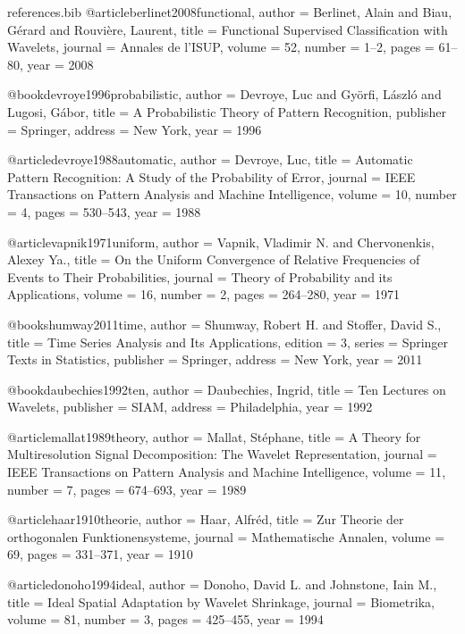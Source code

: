 \begin{filecontents*}[overwrite]{references.bib}
@article{berlinet2008functional,
  author  = {Berlinet, Alain and Biau, G{\'e}rard and Rouvi{\`e}re, Laurent},
  title   = {Functional Supervised Classification with Wavelets},
  journal = {Annales de l'ISUP},
  volume  = {52},
  number  = {1--2},
  pages   = {61--80},
  year    = {2008}
}

@book{devroye1996probabilistic,
  author    = {Devroye, Luc and Gy{\"o}rfi, L{\'a}szl{\'o} and Lugosi, G{\'a}bor},
  title     = {A Probabilistic Theory of Pattern Recognition},
  publisher = {Springer},
  address   = {New York},
  year      = {1996}
}

@article{devroye1988automatic,
  author  = {Devroye, Luc},
  title   = {Automatic Pattern Recognition: A Study of the Probability of Error},
  journal = {IEEE Transactions on Pattern Analysis and Machine Intelligence},
  volume  = {10},
  number  = {4},
  pages   = {530--543},
  year    = {1988}
}

@article{vapnik1971uniform,
  author  = {Vapnik, Vladimir N. and Chervonenkis, Alexey Ya.},
  title   = {On the Uniform Convergence of Relative Frequencies of Events to Their Probabilities},
  journal = {Theory of Probability and its Applications},
  volume  = {16},
  number  = {2},
  pages   = {264--280},
  year    = {1971}
}

@book{shumway2011time,
  author    = {Shumway, Robert H. and Stoffer, David S.},
  title     = {Time Series Analysis and Its Applications},
  edition   = {3},
  series    = {Springer Texts in Statistics},
  publisher = {Springer},
  address   = {New York},
  year      = {2011}
}

@book{daubechies1992ten,
  author    = {Daubechies, Ingrid},
  title     = {Ten Lectures on Wavelets},
  publisher = {SIAM},
  address   = {Philadelphia},
  year      = {1992}
}

@article{mallat1989theory,
  author  = {Mallat, St{\'e}phane},
  title   = {A Theory for Multiresolution Signal Decomposition: The Wavelet Representation},
  journal = {IEEE Transactions on Pattern Analysis and Machine Intelligence},
  volume  = {11},
  number  = {7},
  pages   = {674--693},
  year    = {1989}
}

@article{haar1910theorie,
  author  = {Haar, Alfr{\'e}d},
  title   = {Zur Theorie der orthogonalen Funktionensysteme},
  journal = {Mathematische Annalen},
  volume  = {69},
  pages   = {331--371},
  year    = {1910}
}

@article{donoho1994ideal,
  author  = {Donoho, David L. and Johnstone, Iain M.},
  title   = {Ideal Spatial Adaptation by Wavelet Shrinkage},
  journal = {Biometrika},
  volume  = {81},
  number  = {3},
  pages   = {425--455},
  year    = {1994}
}


\end{filecontents*}
